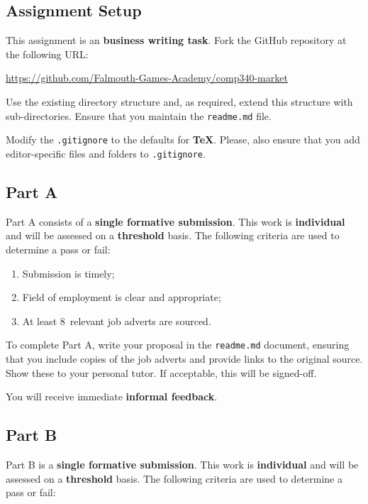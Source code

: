 \documentclass{../../fal_assignment}
\newcommand{\minReferenceCount}{8}
\begin{document}
\subsection*{Assignment Setup}

This assignment is an \textbf{business writing task}. Fork the GitHub repository at the following URL:

\indent \url{https://github.com/Falmouth-Games-Academy/comp340-market}

Use the existing directory structure and, as required, extend this structure with sub-directories. Ensure that you maintain the \texttt{readme.md} file.

Modify the \texttt{.gitignore} to the defaults for \textbf{TeX}. Please, also ensure that you add editor-specific files and folders to \texttt{.gitignore}. 

\subsection*{Part A}

Part A consists of a \textbf{single formative submission}. This work is \textbf{individual} and will be assessed on a \textbf{threshold} basis. The following criteria are used to determine a pass or fail:

\begin{enumerate}[label=(\alph*)]
	\item Submission is timely;
	\item Field of employment is clear and appropriate;
	\item At least \minReferenceCount ~relevant job adverts are sourced.
\end{enumerate}

To complete Part A, write your proposal in the \texttt{readme.md} document, ensuring that you include copies of the job adverts and provide links to the original source.  Show these to your personal tutor.  If acceptable, this will be signed-off. 

You will receive immediate \textbf{informal feedback}.

\subsection*{Part B}

Part B is a \textbf{single formative submission}. This work is \textbf{individual} and will be assessed on a \textbf{threshold} basis. The following criteria are used to determine a pass or fail:
\end{document}
